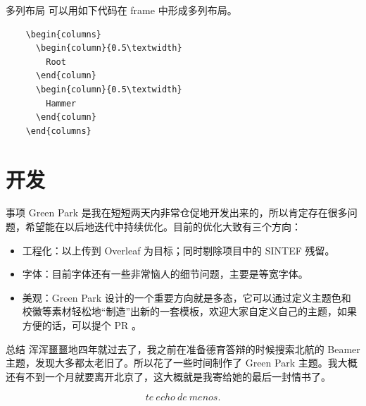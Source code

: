 \documentclass{ctexbeamer}
\begin{document}
\begin{frame}[fragile]{多列布局}
  可以用如下代码在 frame 中形成多列布局。
  \begin{verbatim}
    \begin{columns}  
      \begin{column}{0.5\textwidth}
        Root
      \end{column}
      \begin{column}{0.5\textwidth}
        Hammer
      \end{column}
    \end{columns}
  \end{verbatim}
\end{frame}


\section{开发}
\begin{frame}{事项}
  Green Park 是我在短短两天内非常仓促地开发出来的，所以肯定存在很多问题，希望能在以后地迭代中持续优化。目前的优化大致有三个方向：

  \begin{itemize}
  \item 工程化：以上传到 Overleaf 为目标；同时剔除项目中的 SINTEF 残留。
  \item 字体：目前字体还有一些非常恼人的细节问题，主要是等宽字体。
  \item 美观：Green Park 设计的一个重要方向就是多态，它可以通过定义主题色和校徽等素材轻松地“制造”出新的一套模板，欢迎大家自定义自己的主题，如果方便的话，可以提个 PR 。
  \end{itemize}
\end{frame}

\begin{frame}{总结}
  浑浑噩噩地四年就过去了，我之前在准备德育答辩的时候搜索北航的 Beamer 主题，发现大多都太老旧了。所以花了一些时间制作了 Green Park 主题。我大概还有不到一个月就要离开北京了，这大概就是我寄给她的最后一封情书了。

  $$
  te \ echo\  de\  menos.
  $$

\end{frame}


\backmatter
\end{document}

